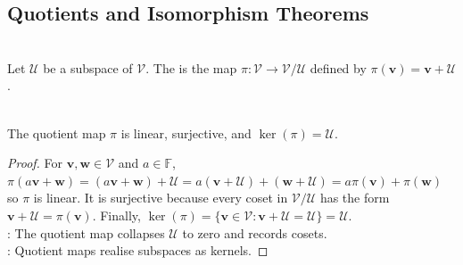 \subsection{Quotients and Isomorphism Theorems}
\begin{definition} \\
Let $\mathcal{U}$ be a subspace of $\mathcal{V}$. The  is the map $\pi : \mathcal{V} \to \mathcal{V}/\mathcal{U}$ defined by $\pi(\mathbf{v})=\mathbf{v}+\mathcal{U}$.
\end{definition}

\begin{proposition} \label{prop:quotient-map-properties} \\
The quotient map $\pi$ is linear, surjective, and $\ker(\pi) = \mathcal{U}$.
\begin{proof}
For $\mathbf{v},\mathbf{w}\in\mathcal{V}$ and $a\in\mathbb{F}$, $\pi(a\mathbf{v}+\mathbf{w})=(a\mathbf{v}+\mathbf{w})+\mathcal{U} =a(\mathbf{v}+\mathcal{U})+(\mathbf{w}+\mathcal{U}) =a\pi(\mathbf{v})+\pi(\mathbf{w})$ so $\pi$ is linear. It is surjective because every coset in $\mathcal{V}/\mathcal{U}$ has the form $\mathbf{v}+\mathcal{U}=\pi(\mathbf{v})$. Finally, $\ker(\pi)=\{\mathbf{v}\in\mathcal{V}:\mathbf{v}+\mathcal{U}=\mathcal{U}\}=\mathcal{U}$.\\
: The quotient map collapses $\mathcal{U}$ to zero and records cosets.\\
: Quotient maps realise subspaces as kernels.
\end{proof}
\end{proposition}

